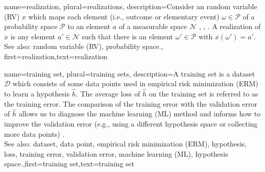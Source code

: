  
	
{name={realization}, plural={realizations},
	description={Consider an random variable (RV) $x$ which maps each element 
	(i.e., outcome or elementary event) $\omega \in \mathcal{P}$ of a probability space $\mathcal{P}$ 
	to an element $a$ of a measurable space $\mathcal{N}$ \cite{RudinBookPrinciplesMatheAnalysis}, \cite{HalmosMeasure}, \cite{BillingsleyProbMeasure}. 
	A realization of $x$ is any element $a' \in \mathcal{N}$ such that there is 
	an element $\omega' \in \mathcal{P}$ with $x(\omega') = a'$.
			\\
		See also: random variable (RV), probability space.}, first={realization},text={realization}  }

{name={training set}, plural={training sets},
description={A training set is a dataset $\mathcal{D}$ which consists of some data points used in empirical risk minimization (ERM) 
	to learn a hypothesis $\hat{h}$. The average loss of $\hat{h}$ on the 
	training set is referred to as the training error. The comparison of the training error with the 
	validation error of $\hat{h}$ allows us to diagnose the machine learning (ML) method and informs how to improve 
	the validation error (e.g., using a different hypothesis space or collecting more data points) \cite[Sec. 6.6]{MLBasics}.
			\\
		See also: dataset, data point, empirical risk minimization (ERM), hypothesis, loss, training error, validation error, machine learning (ML), hypothesis space.},first={training set},text={training set}  
}

